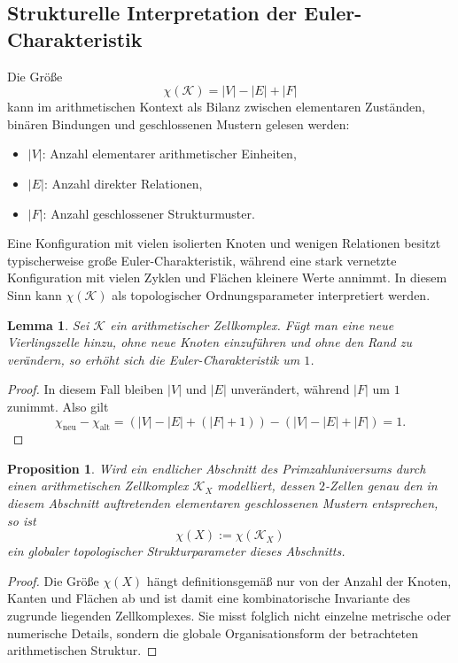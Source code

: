 \documentclass[11pt,a4paper]{article}
\theoremstyle{definition}
\theoremstyle{plain}
\newtheorem{proposition}[definition]{Proposition}
\newtheorem{lemma}[definition]{Lemma}
\theoremstyle{remark}
\begin{document}
	\subsection{Strukturelle Interpretation der Euler-Charakteristik}
	
	Die Größe
	\[
	\chi(\mathcal{K})=|V|-|E|+|F|
	\]
	kann im arithmetischen Kontext als Bilanz zwischen elementaren Zuständen, binären Bindungen und geschlossenen Mustern gelesen werden:
	\begin{itemize}
		\item \( |V| \): Anzahl elementarer arithmetischer Einheiten,
		\item \( |E| \): Anzahl direkter Relationen,
		\item \( |F| \): Anzahl geschlossener Strukturmuster.
	\end{itemize}
	
	Eine Konfiguration mit vielen isolierten Knoten und wenigen Relationen besitzt typischerweise große Euler-Charakteristik, während eine stark vernetzte Konfiguration mit vielen Zyklen und Flächen kleinere Werte annimmt. In diesem Sinn kann \(\chi(\mathcal{K})\) als topologischer Ordnungsparameter interpretiert werden.
	
	\begin{lemma}
		Sei \(\mathcal{K}\) ein arithmetischer Zellkomplex. Fügt man eine neue Vierlingszelle hinzu, ohne neue Knoten einzuführen und ohne den Rand zu verändern, so erhöht sich die Euler-Charakteristik um \(1\).
	\end{lemma}
	
	\begin{proof}
		In diesem Fall bleiben \(|V|\) und \(|E|\) unverändert, während \(|F|\) um \(1\) zunimmt. Also gilt
		\[
		\chi_{\mathrm{neu}}-\chi_{\mathrm{alt}}
		=
		(|V|-|E|+(|F|+1))-(|V|-|E|+|F|)=1.
		\]
	\end{proof}
	
	\begin{proposition}
		Wird ein endlicher Abschnitt des Primzahluniversums durch einen arithmetischen Zellkomplex \(\mathcal{K}_X\) modelliert, dessen \(2\)-Zellen genau den in diesem Abschnitt auftretenden elementaren geschlossenen Mustern entsprechen, so ist
		\[
		\chi(X):=\chi(\mathcal{K}_X)
		\]
		ein globaler topologischer Strukturparameter dieses Abschnitts.
	\end{proposition}
	
	\begin{proof}
		Die Größe \(\chi(X)\) hängt definitionsgemäß nur von der Anzahl der Knoten, Kanten und Flächen ab und ist damit eine kombinatorische Invariante des zugrunde liegenden Zellkomplexes. Sie misst folglich nicht einzelne metrische oder numerische Details, sondern die globale Organisationsform der betrachteten arithmetischen Struktur.
	\end{proof}
	
\end{document}
